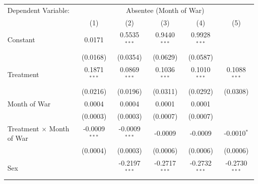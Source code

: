 \begingroup
\centering
\renewcommand{\arraystretch}{0.75}   %
\setlength{\aboverulesep}{0pt}       %
\setlength{\belowrulesep}{0pt} 
\begin{tabular}{lccccc}
   \tabularnewline \midrule \midrule
   Dependent Variable: & \multicolumn{5}{c}{Absentee (Month of War)}\\
                                              
                                        & (1)             & (2)                     & (3)                            & (4)                            & (5)\\  
   \midrule
   
   Constant                                    & 0.0171          & 0.5535$^{***}$          & 0.9440$^{***}$                 & 0.9928$^{***}$                 &   \\   
                                               & (0.0168)        & (0.0354)                & (0.0629)                       & (0.0587)                       &   \\   
   Treatment                                   & 0.1871$^{***}$  & 0.0869$^{***}$          & 0.1036$^{***}$                 & 0.1010$^{***}$                 & 0.1088$^{***}$\\   
                                               & (0.0216)        & (0.0196)                & (0.0311)                       & (0.0292)                       & (0.0308)\\   
   Month of War                              & 0.0004          & 0.0004                  & 0.0001                         & 0.0001                         &   \\   
                                               & (0.0003)        & (0.0003)                & (0.0007)                       & (0.0007)                       &   \\   
   Treatment $\times$ Month of War           & -0.0009$^{***}$ & -0.0009$^{***}$         & -0.0009                        & -0.0009                        & -0.0010$^{*}$\\   
                                               & (0.0004)        & (0.0003)                & (0.0006)                       & (0.0006)                       & (0.0006)\\   
   Sex                                         &                 & -0.2197$^{***}$         & -0.2717$^{***}$                & -0.2732$^{***}$                & -0.2730$^{***}$\\   

\end{tabular}
